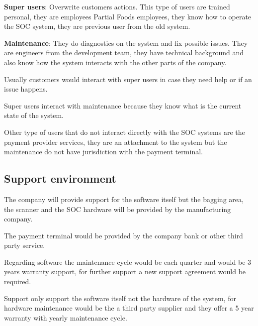 \textbf{Super users}: Overwrite customers actions. This type of users are 
trained personal, they are employees Partial Foods employees, they know how to 
operate the SOC system, they are previous user from the old system. \newline

\textbf{Maintenance}: They do diagnostics on the system and fix possible 
issues. They are engineers from the development team, they have technical 
background and also know how the system interacts with the other parts 
of the company. \newline

Usually customers would interact with super users in case they need help or 
if an issue happens. \newline

Super users interact with maintenance because they know what is the current 
state of the system. \newline

Other type of users that do not interact directly with the SOC systems are the 
payment provider services, they are an attachment to the system but the 
maintenance do not have jurisdiction with the payment terminal. \newline

\subsection{Support environment}
The company will provide support for the software itself but the bagging 
area, the scanner and the SOC hardware will be provided by the 
manufacturing company. \newline

The payment terminal would be provided by the company bank or other third 
party service. \newline

Regarding software the maintenance cycle would be each quarter and would be 3 
years warranty support, for further support a new support agreement would be 
required. \newline

Support only support the software itself not the hardware of the system, for 
hardware maintenance would be the a third party supplier and they offer a 
5 year warranty with yearly maintenance cycle. \newline
